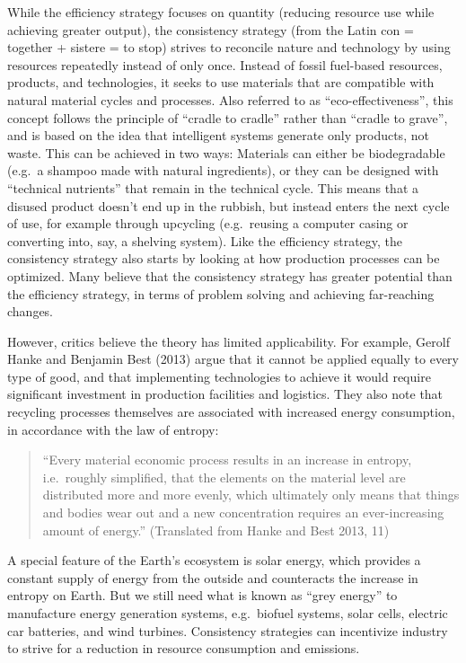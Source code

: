 \documentclass[
  a4paper,
  DIV=11,
  numbers=noendperiod,
  oneside,
  openany]{scrreprt}
\begin{document}
While the efficiency strategy focuses on quantity (reducing resource use
while achieving greater output), the consistency strategy (from the
Latin con = together + sistere = to stop) strives to reconcile nature
and technology by using resources repeatedly instead of only once.
Instead of fossil fuel-based resources, products, and technologies, it
seeks to use materials that are compatible with natural material cycles
and processes. Also referred to as ``eco-effectiveness'', this concept
follows the principle of ``cradle to cradle'' rather than ``cradle to
grave'', and is based on the idea that intelligent systems generate only
products, not waste. This can be achieved in two ways: Materials can
either be biodegradable (e.g.~a shampoo made with natural ingredients),
or they can be designed with ``technical nutrients'' that remain in the
technical cycle. This means that a disused product doesn't end up in the
rubbish, but instead enters the next cycle of use, for example through
upcycling (e.g.~reusing a computer casing or converting into, say, a
shelving system). Like the efficiency strategy, the consistency strategy
also starts by looking at how production processes can be optimized.
Many believe that the consistency strategy has greater potential than
the efficiency strategy, in terms of problem solving and achieving
far-reaching changes.

However, critics believe the theory has limited applicability. For
example, Gerolf Hanke and Benjamin Best (2013) argue that it cannot be
applied equally to every type of good, and that implementing
technologies to achieve it would require significant investment in
production facilities and logistics. They also note that recycling
processes themselves are associated with increased energy consumption,
in accordance with the law of entropy:

\begin{quote}
``Every material economic process results in an increase in entropy,
i.e.~roughly simplified, that the elements on the material level are
distributed more and more evenly, which ultimately only means that
things and bodies wear out and a new concentration requires an
ever-increasing amount of energy.'' (Translated from Hanke and Best
2013, 11)
\end{quote}

A special feature of the Earth's ecosystem is solar energy, which
provides a constant supply of energy from the outside and counteracts
the increase in entropy on Earth. But we still need what is known as
``grey energy'' to manufacture energy generation systems, e.g.~biofuel
systems, solar cells, electric car batteries, and wind turbines.
Consistency strategies can incentivize industry to strive for a
reduction in resource consumption and emissions.
\end{document}
